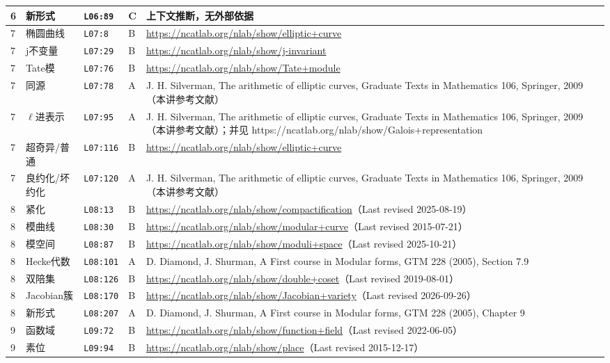 \begin{longtable}{@{}p{1.0cm}p{3.3cm}p{1.5cm}p{1.3cm}p{7.9cm}@{}}
6 & 新形式 & \texttt{L06:89} & C & 上下文推断，无外部依据 \\
\midrule
7 & 椭圆曲线 & \texttt{L07:8} & B & \url{https://ncatlab.org/nlab/show/elliptic+curve} \\
7 & j不变量 & \texttt{L07:29} & B & \url{https://ncatlab.org/nlab/show/j-invariant} \\
7 & Tate模 & \texttt{L07:76} & B & \url{https://ncatlab.org/nlab/show/Tate+module} \\
7 & 同源 & \texttt{L07:78} & A & J. H. Silverman, The arithmetic of elliptic curves, Graduate Texts in Mathematics 106, Springer, 2009（本讲参考文献） \\
7 & $\ell$进表示 & \texttt{L07:95} & A & J. H. Silverman, The arithmetic of elliptic curves, Graduate Texts in Mathematics 106, Springer, 2009（本讲参考文献）；并见 https://ncatlab.org/nlab/show/Galois+representation \\
7 & 超奇异/普通 & \texttt{L07:116} & B & \url{https://ncatlab.org/nlab/show/elliptic+curve} \\
7 & 良约化/坏约化 & \texttt{L07:120} & A & J. H. Silverman, The arithmetic of elliptic curves, Graduate Texts in Mathematics 106, Springer, 2009（本讲参考文献） \\
\midrule
8 & 紧化 & \texttt{L08:13} & B & \url{https://ncatlab.org/nlab/show/compactification}（Last revised 2025-08-19） \\
8 & 模曲线 & \texttt{L08:30} & B & \url{https://ncatlab.org/nlab/show/modular+curve}（Last revised 2015-07-21） \\
8 & 模空间 & \texttt{L08:87} & B & \url{https://ncatlab.org/nlab/show/moduli+space}（Last revised 2025-10-21） \\
8 & Hecke代数 & \texttt{L08:101} & A & D. Diamond, J. Shurman, A First course in Modular forms, GTM 228 (2005), Section 7.9 \\
8 & 双陪集 & \texttt{L08:126} & B & \url{https://ncatlab.org/nlab/show/double+coset}（Last revised 2019-08-01） \\
8 & Jacobian簇 & \texttt{L08:170} & B & \url{https://ncatlab.org/nlab/show/Jacobian+variety}（Last revised 2026-09-26） \\
8 & 新形式 & \texttt{L08:207} & A & D. Diamond, J. Shurman, A First course in Modular forms, GTM 228 (2005), Chapter 9 \\
\midrule
9 & 函数域 & \texttt{L09:72} & B & \url{https://ncatlab.org/nlab/show/function+field}（Last revised 2022-06-05） \\
9 & 素位 & \texttt{L09:94} & B & \url{https://ncatlab.org/nlab/show/place}（Last revised 2015-12-17） \\

\end{longtable}
